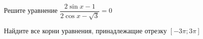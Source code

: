 \begin{ex}
	\begin{condition}
		\begin{enumcols}[label=\asbuk*)]
			\item Решите уравнение \( \dfrac{2\sin  x- 1}{2 \cos x - \sqrt{3}} =0 \)
			\item Найдите все корни уравнения, принадлежащие отрезку \( \left[-3\pi;3\pi\right] \)
		\end{enumcols}
	\end{condition}
\end{ex}
